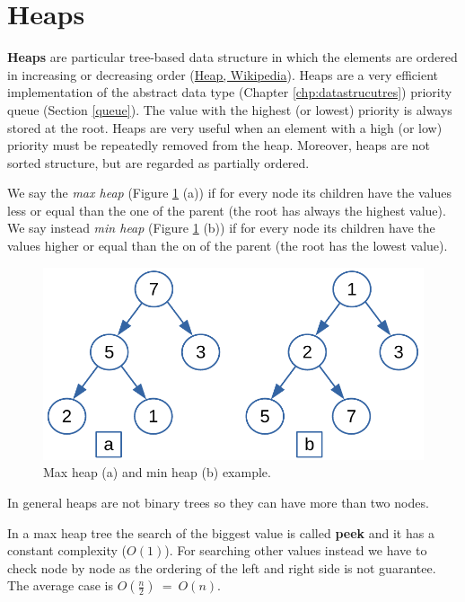 \section{Heaps}
\textbf{Heaps} are particular tree-based data structure in which the elements are ordered in increasing or decreasing order \cite{wikiheap} (\href{https://en.wikipedia.org/wiki/Heap_(data_structure)}{Heap, Wikipedia}). Heaps are a very efficient implementation of the abstract data type (Chapter \ref{chp:datastrucutres}) priority queue (Section \ref{queue}). The value with the highest (or lowest) priority is always stored at the root. Heaps are very useful when an element with a high (or low) priority must be repeatedly removed from the heap. Moreover, heaps are not sorted structure, but are regarded as partially ordered.    

We say the \textit{max heap} (Figure \ref{trees_16} (a)) if for every node its children have the values less or equal than the one of the parent (the root has always the highest value). We say instead \textit{min heap} (Figure \ref{trees_16} (b)) if for every node its children have the values higher or equal than the on of the parent (the root has the lowest value).

\begin{figure}[H]
	\begin{center}
		\includegraphics[scale=.6]{chapters/trees/images/trees_16.pdf}
		\caption[Max heap (a) and min heap (b) example.]{Max heap (a) and min heap (b) example.}
		\label{trees_16}
	\end{center}
\end{figure}

In general heaps are not binary trees so they can have more than two nodes.

In a max heap tree the search of the biggest value is called \textbf{peek} and it has a constant complexity (\(O(1)\)). For searching other values instead we have to check node by node as the ordering of the left and right side is not guarantee. The average case is \(O(\frac{n}{2})\ = \ O(n)\).
